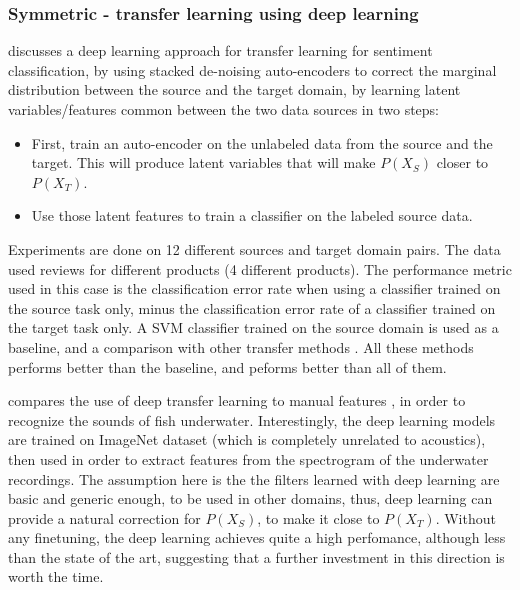   \subsubsection{Symmetric - transfer learning using deep learning}
  \par \citep{glorot2011domain} discusses a deep learning approach for transfer learning for sentiment classification, by using stacked de-noising auto-encoders \citep{vincent2008extracting} to correct the marginal distribution between the source and the target domain, by learning latent variables/features common between the two data sources in two steps:
  \begin{itemize}
      \item First, train an auto-encoder on the unlabeled data from the source and the target. This will produce latent variables that will make $P(X_S)$ closer to $P(X_T)$.
      \item Use those latent features to train a classifier on the labeled source data.
  \end{itemize}
  \par Experiments are done on 12 different sources and target domain pairs. The data used reviews for different products (4 different products). The performance metric used in this case is the classification error rate when using a classifier trained on the source task only, minus the classification error rate of a classifier trained on the target task only. A SVM classifier trained on the source domain is used as a baseline, and a comparison with other transfer methods \citep{blitzer2006domain,li2008multi,pan2010cross}. All these methods performs better than the baseline, and \citep{glorot2011domain} peforms better than all of them.

  \par \citep{malfante2018use} compares the use of deep transfer learning to manual features \citep{malfante2016automatic,malfante2018machine}, in order to recognize the sounds of fish underwater. Interestingly, the deep learning models are trained on ImageNet \citep{imagenet_cvpr09} dataset (which is completely unrelated to acoustics), then used in order to extract features from the spectrogram of the underwater recordings. The assumption here is the the filters learned with deep learning are basic and generic enough, to be used in other domains, thus, deep learning can provide a natural correction for $P(X_S)$, to make it close to $P(X_T)$. Without any finetuning, the deep learning achieves quite a high perfomance, although less than the state of the art, suggesting that a further investment in this direction is worth the time.

